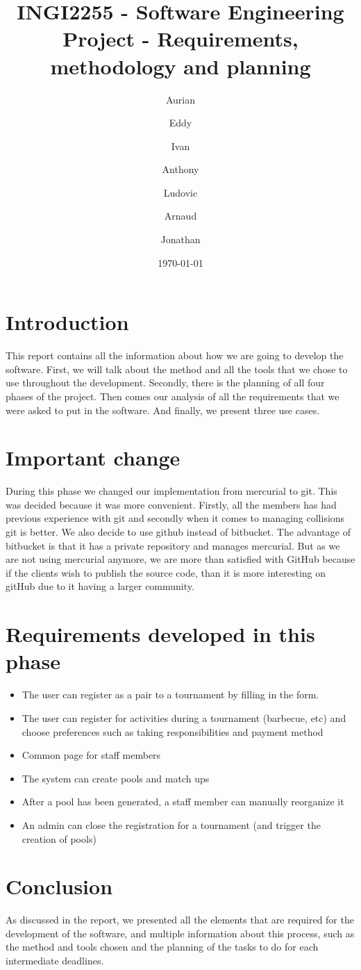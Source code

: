 \documentclass[a4paper, 12pt]{article}
\author{Aurian \bsc{De Potter}  \and Eddy \bsc{Ndizera}  \and Ivan \bsc{Ahad} \and Anthony \bsc{Dechamps} \and Ludovic \bsc{Fastré} \and Arnaud \bsc{Dethise} \and Jonathan \bsc{Legat}}
\title{INGI2255 - Software Engineering Project - Requirements, methodology and planning}
\date{\today}
\begin{document}
\maketitle
\section{Introduction}
This report contains all the information about how we are going to develop the software. First, we will talk about the  method and all the tools that we chose to use throughout the development. Secondly, there is the planning of all four phases of the project. Then comes our analysis of all the requirements that we were asked to put in the software. And finally, we present three use cases.  

\section{Important change}

During this phase we changed our implementation from mercurial to git. This was decided because it was more convenient. Firstly, all the members has had previous experience with git and secondly when it comes to managing collisions git is better. We also decide to use github instead of bitbucket. The advantage of bitbucket is that it has a private repository and manages mercurial. But as we are not using mercurial anymore, we are more than satisfied with GitHub because if the clients wish to publish the source code, than it is more interesting on gitHub due to it having a larger community.

\section{Requirements developed in this phase}
\begin{itemize}
\item The user can register as a pair to a tournament by filling in the form.
\item The user can register for activities during a tournament (barbecue, etc) and choose preferences such as taking responsibilities and payment method
\item Common page for staff members
\item The system can create pools and match ups
\item After a pool has been generated, a staff member can manually reorganize it 
\item An admin can close the registration for a tournament (and trigger the creation of pools)

\end{itemize}
\section{Conclusion}
As discussed in the report, we presented all the elements that  are required for the development of the software, and multiple information about this process, such as the method and tools chosen and the planning of the tasks to do for each intermediate deadlines. 
\end{document}
